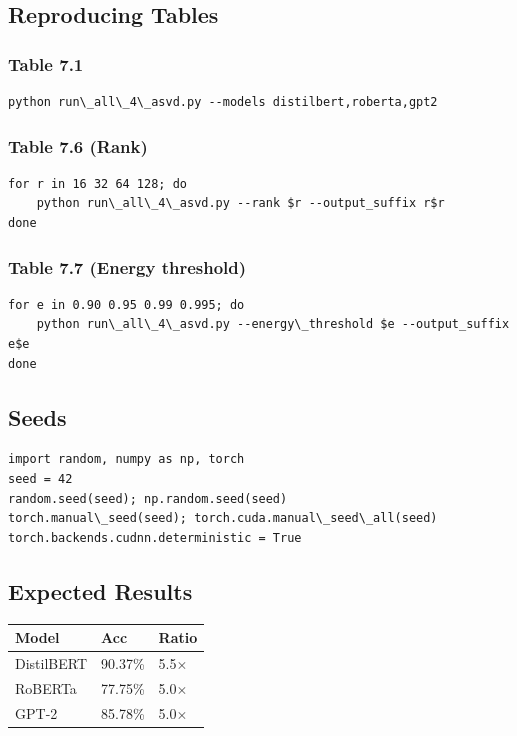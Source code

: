\subsection{Reproducing Tables}

\subsubsection{Table 7.1}
\begin{lstlisting}
python run\_all\_4\_asvd.py --models distilbert,roberta,gpt2
\end{lstlisting}

\subsubsection{Table 7.6 (Rank)}
\begin{lstlisting}
for r in 16 32 64 128; do
    python run\_all\_4\_asvd.py --rank $r --output_suffix r$r
done
\end{lstlisting}

\subsubsection{Table 7.7 (Energy threshold)}
\begin{lstlisting}
for e in 0.90 0.95 0.99 0.995; do
    python run\_all\_4\_asvd.py --energy\_threshold $e --output_suffix e$e
done
\end{lstlisting}

\subsection{Seeds}

\begin{lstlisting}
import random, numpy as np, torch
seed = 42
random.seed(seed); np.random.seed(seed)
torch.manual\_seed(seed); torch.cuda.manual\_seed\_all(seed)
torch.backends.cudnn.deterministic = True
\end{lstlisting}

\subsection{Expected Results}

\begin{table}[H]
\centering
\small
\begin{tabular}{lll}
\toprule
\textbf{Model} & \textbf{Acc} & \textbf{Ratio} \\
\midrule
DistilBERT & 90.37\% & 5.5$\times$ \\
RoBERTa & 77.75\% & 5.0$\times$ \\
GPT-2 & 85.78\% & 5.0$\times$ \\
\bottomrule
\end{tabular}
\end{table}

